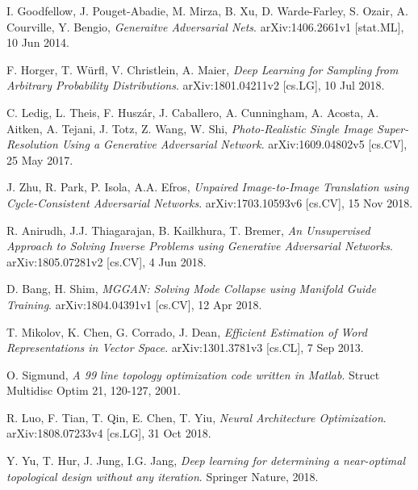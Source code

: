 \documentclass[a4paper]{article}
\begin{document}
\begin{thebibliography}{999}
  I. Goodfellow, J. Pouget-Abadie, M. Mirza, B. Xu, D. Warde-Farley, S. Ozair, A. Courville, Y. Bengio,
  \emph{Generaitve Adversarial Nets}.
  arXiv:1406.2661v1 [stat.ML],
  10 Jun 2014.

  F. Horger, T. W\"urfl, V. Christlein, A. Maier,
  \emph{Deep Learning for Sampling from Arbitrary Probability Distributions}.
  arXiv:1801.04211v2 [cs.LG],
  10 Jul 2018.

  C. Ledig, L. Theis, F. Husz\'ar, J. Caballero, A. Cunningham, A. Acosta, A. Aitken, A. Tejani, J. Totz, Z. Wang, W. Shi,
  \emph{Photo-Realistic Single Image Super-Resolution Using a Generative Adversarial Network}.
  arXiv:1609.04802v5 [cs.CV],
  25 May 2017.

  J. Zhu, R. Park, P. Isola, A.A. Efros,
  \emph{Unpaired Image-to-Image Translation using Cycle-Consistent Adversarial Networks}.
  arXiv:1703.10593v6 [cs.CV],
  15 Nov 2018.

  R. Anirudh, J.J. Thiagarajan, B. Kailkhura, T. Bremer,
  \emph{An Unsupervised Approach to Solving Inverse Problems using Generative Adversarial Networks}.
  arXiv:1805.07281v2 [cs.CV],
  4 Jun 2018.

  D. Bang, H. Shim,
  \emph{MGGAN: Solving Mode Collapse using Manifold Guide Training}.
  arXiv:1804.04391v1 [cs.CV],
  12 Apr 2018.


  T. Mikolov, K. Chen, G. Corrado, J. Dean,
  \emph{Efficient Estimation of Word Representations in Vector Space}.
  arXiv:1301.3781v3 [cs.CL],
  7 Sep 2013.

  O. Sigmund,
  \emph{A 99 line topology optimization code written in Matlab}.
  Struct Multidisc Optim 21,
  120-127,
  2001.

  R. Luo, F. Tian, T. Qin, E. Chen, T. Yiu,
  \emph{Neural Architecture Optimization}.
  arXiv:1808.07233v4 [cs.LG],
  31 Oct 2018.

  Y. Yu, T. Hur, J. Jung, I.G. Jang,
  \emph{Deep learning for determining a near-optimal topological design without any iteration}.
  Springer Nature,
  2018.

\end{thebibliography}
\end{document}
